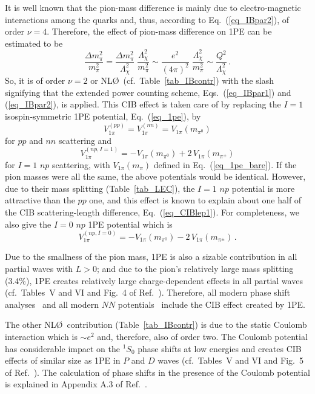 \documentclass[sort&compress,preprint,3p]{elsarticle}
\begin{document}
It is well known that the pion-mass difference is mainly due to electro-magnetic interactions
among the quarks and, thus, according to Eq.~(\ref{eq_IBpar2}), of order $\nu=4$. Therefore,
the effect of pion-mass difference on 1PE can be estimated to be
\begin{equation}
\frac{\Delta m_\pi^2}{m_\pi^2}  =
\frac{\Delta m_\pi^2}{\Lambda_\chi^2} \;
\frac{\Lambda_\chi^2}{m_\pi^2}
\sim \frac{e^2}{(4\pi)^2} \; \frac{\Lambda_\chi^2}{m_\pi^2}
\sim \frac{Q^2}{\Lambda_\chi^2}
\,.
\end{equation}
So, it is of order $\nu=2$ or NL\O \, (cf.\ Table~\ref{tab_IBcontr})
with the slash signifying that the extended power counting
scheme, Eqs.~(\ref{eq_IBpar1}) and (\ref{eq_IBpar2}), is applied.
This CIB effect is taken care of by replacing the $I=1$ isospin-symmetric 1PE potential, Eq.~(\ref{eq_1pe}),
by
\begin{equation}
V^{(pp)}_{1\pi}=V^{(nn)}_{1\pi}=V_{1\pi}(m_{\pi^0})
\end{equation}
for $pp$ and $nn$ scattering and
\begin{equation}
V^{(np,I=1)}_{1\pi}=
-V_{1\pi}(m_{\pi^0}) +2\,V_{1\pi}(m_{\pi^\pm})
\end{equation}
for $I=1$ $np$ scattering, with $V_{1\pi}(m_\pi)$ defined in Eq.~(\ref{eq_1pe_bare}). 
If the pion masses were all the same, the above potentials would be identical.
However, due to their mass splitting (Table~\ref{tab_LEC}), the $I=1$ $np$ potential is more attractive
than the $pp$ one, and this effect is known to explain about one half of the CIB scattering-length
difference, Eq.~(\ref{eq_CIBlep1}).
For completeness, we also give the $I=0$ $np$ 1PE potential which is
\begin{equation}
V^{(np,I=0)}_{1\pi}=
-V_{1\pi}(m_{\pi^0}) -2\,V_{1\pi}(m_{\pi^\pm})
\,.
\end{equation}

Due to the smallness of the pion mass, 1PE is also a sizable
contribution in all partial waves with $L>0$;
and due to the pion's relatively large mass splitting (3.4\%),
1PE creates relatively large charge-dependent effects 
in all partial waves 
(cf.\ Tables~V and VI and Fig.~4 of Ref.~\cite{Mac01}).
Therefore,
all modern phase shift analyses~\cite{SM99,Sto93} and all
modern $NN$ potentials~\cite{Mac01,Sto94,WSS95}
include the CIB effect created by 1PE.

The other NL\O \, contribution (Table~\ref{tab_IBcontr}) is due to the 
static Coulomb interaction which is $\sim e^2$ and,
therefore, also of order two. The Coulomb potential has considerable
impact on the $^1S_0$ phase shifts at low energies and creates CIB effects of similar size as
1PE in $P$ and $D$ waves (cf.\ Tables~V and VI and Fig.~5 of Ref.~\cite{Mac01}).
The calculation of phase shifts in the presence of the Coulomb potential is explained
in Appendix A.3 of Ref.~\cite{Mac01}.
\end{document}

